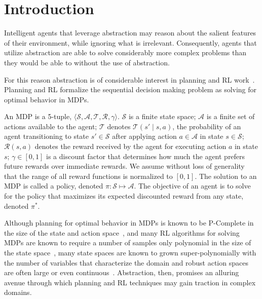 \section{Introduction}
\label{sec:intro}

Intelligent agents that leverage abstraction may reason about the salient features of their environment, while ignoring what is irrelevant. Consequently, agents that utilize abstraction are able to solve considerably more complex problems than they would be able to without the use of abstraction. 

For this reason abstraction is of considerable interest in planning and \ac{RL} work~. Planning and \ac{RL} formalize the sequential decision making problem as solving for optimal behavior in \acp{MDP}. 

An \ac{MDP} is a 5-tuple, $\langle \mathcal{S}, \mathcal{A}, \mathcal{T}, \mathcal{R}, \gamma \rangle$. $\mathcal{S}$ is a finite state space; $\mathcal{A}$ is a finite set of actions available to the agent; $\mathcal{T}$ denotes $\mathcal{T}(s' \mid s,a)$, the probability of an agent transitioning to state $s' \in \mathcal{S}$ after applying action $a \in \mathcal{A}$ in state $s \in \mathcal{S}$; $\mathcal{R}(s,a)$ denotes the reward received by the agent for executing action $a$ in state $s$; $\gamma \in [0, 1]$ is a discount factor that determines how much the agent prefers future rewards over immediate rewards. We assume without loss of generality that the range of all reward functions is normalized to $[0,1]$. The solution to an \ac{MDP} is called a policy, denoted $\pi: \mathcal{S} \mapsto \mathcal{A}$. The objective of an agent is to solve for the policy that maximizes its expected discounted reward from any state, denoted $\pi^*$. 

 Although planning for optimal behavior in \acp{MDP} is known to be P-Complete in the size of the state and action space~\cite{papadimitriou1987complexity,littman1995complexity}, and many \ac{RL} algorithms for solving \acp{MDP} are known to require a number of samples only polynomial in the size of the state space~\cite{strehl2009reinforcement}, many state spaces are known to grown super-polynomially with the number of variables that characterize the domain \cite{abel2015goal} and robust action spaces are often large or even continuous~\cite{antos2008fitted,konidaris2014constructing}. Abstraction, then, promises an alluring avenue through which planning and \ac{RL} techniques may gain traction in complex domains. 

